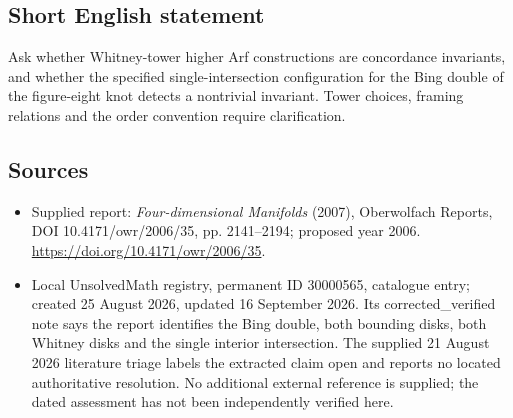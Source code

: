 \documentclass[11pt]{article}
\begin{document}
\subsection{Short English statement}
Ask whether Whitney-tower higher Arf constructions are concordance invariants, and whether the specified single-intersection configuration for the Bing double of the figure-eight knot detects a nontrivial invariant. Tower choices, framing relations and the order convention require clarification.
\subsection{Sources}
\begin{itemize}
\item Supplied report: \emph{Four-dimensional Manifolds} (2007), Oberwolfach Reports, DOI 10.4171/owr/2006/35, pp. 2141--2194; proposed year 2006. \url{https://doi.org/10.4171/owr/2006/35}.
\item Local UnsolvedMath registry, permanent ID 30000565, catalogue entry; created 25 August 2026, updated 16 September 2026. Its corrected\_verified note says the report identifies the Bing double, both bounding disks, both Whitney disks and the single interior intersection. The supplied 21 August 2026 literature triage labels the extracted claim open and reports no located authoritative resolution. No additional external reference is supplied; the dated assessment has not been independently verified here.
\end{itemize}
\end{document}
